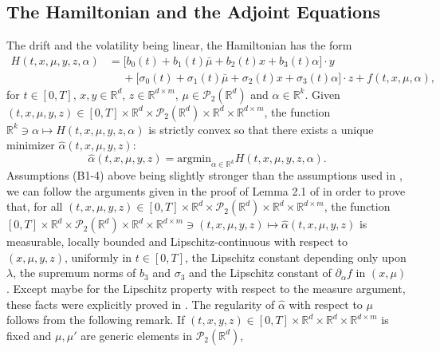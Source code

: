 \documentclass[11pt]{amsart}
\begin{document}
\subsection{The Hamiltonian and the Adjoint Equations}
The drift and the volatility being linear, the Hamiltonian has the form
\begin{equation*}
\begin{split}
H(t,x,\mu,y,z,\alpha) &= \bigl[b_0(t)+b_1(t)\bar{\mu}+b_2(t)x+b_3(t)\alpha\bigr]\cdot y  
\\
&\hspace{15pt}
+ \bigl[ \sigma_{0}(t) + \sigma_{1}(t) \bar{\mu} + \sigma_{2}(t) x + \sigma_{3}(t) \alpha \bigr] \cdot z
 + f(t,x,\mu,\alpha),
\end{split}
\end{equation*}
for $t \in [0,T]$, $x,y \in {\mathbb R}^d$, $z \in {\mathbb R}^{d \times m}$, $\mu \in {\mathcal P}_2({\mathbb R}^d)$ and $\alpha \in {\mathbb R}^k$.
Given $(t,x,\mu,y,z) \in [0,T] \times {\mathbb R}^d \times {\mathcal P}_{2}({\mathbb R}^d) \times {\mathbb R}^d \times {\mathbb R}^{d \times m}$, the function ${\mathbb R}^k \ni \alpha \mapsto H(t,x,\mu,y,z,\alpha)$ is strictly convex so that 
there exists a unique minimizer $\hat{\alpha}(t,x,\mu,y,z)$:
\begin{equation}
\label{fo:alphahat}
\hat{\alpha}(t,x,\mu,y,z) = \textrm{argmin}_{\alpha \in {\mathbb R}^k} H(t,x,\mu,y,z,\alpha).
\end{equation}
Assumptions (B1-4) above being slightly stronger than the assumptions used in \cite{CarmonaDelarue_sicon}, we can follow the arguments given in the proof of Lemma 2.1 of \cite{CarmonaDelarue_sicon} in order to prove that,
for all $(t,x,\mu,y,z)\in [0,T] \times {\mathbb R}^d \times {\mathcal P}_{2}({\mathbb R}^d) \times {\mathbb R}^d \times {\mathbb R}^{d \times m}$,
the function $[0,T] \times {\mathbb R}^d \times {\mathcal P}_{2}({\mathbb R}^d) \times {\mathbb R}^d \times {\mathbb R}^{d \times m}
\ni (t,x,\mu,y,z)   \mapsto \hat{\alpha}(t,x,\mu,y,z)$ is measurable, locally bounded and Lipschitz-continuous with respect to 
$(x,\mu,y,z)$, uniformly in $t\in [0,T]$, the Lipschitz constant depending only upon $\lambda$, the supremum norms 
of $b_{3}$ and $\sigma_{3}$ and the Lipschitz 
constant of $\partial_{\alpha}f$ in $(x,\mu)$. Except maybe for the Lipschitz property with respect to the measure argument, these facts were explicitly proved in
\cite{CarmonaDelarue_sicon}. The regularity of $\hat{\alpha}$ with respect to $\mu$ follows from the following remark.
If $(t,x,y,z) \in  [0,T] \times {\mathbb R}^d \times {\mathbb R}^d \times {\mathbb R}^{d \times m}$ is fixed and $\mu,\mu'$ are generic elements in ${\mathcal P}_{2}({\mathbb R}^d)$,
\end{document}
